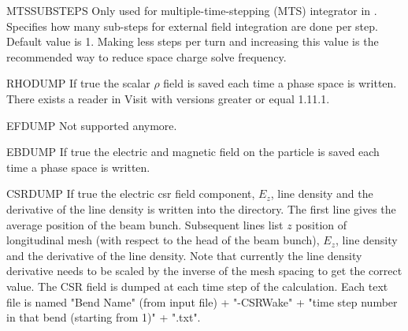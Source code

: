 \begin{kdescription}
  \item[MTSSUBSTEPS]
  Only used for multiple-time-stepping (MTS) integrator in \opalcycl. Specifies how many sub-steps for external field integration are done per step. Default value is 1.
  Making less steps per turn and increasing this value is the recommended way to reduce space charge solve frequency.

  \item[RHODUMP]
  If true the scalar $\rho$ field is saved each time a phase space is written. There exists a reader in Visit with versions
  greater or equal 1.11.1.

  \item[EFDUMP]
  Not supported anymore.

  \item[EBDUMP]
  If true the electric and magnetic field on the particle is saved each time a phase space is written.

  \item[CSRDUMP]
  If true the electric csr field component, $E_z$, line density and the derivative of the line density is written into the  directory.
  The first line gives the average position of the beam bunch.
  Subsequent lines list $z$ position of longitudinal mesh (with respect to the head of the beam bunch),
   $E_z$, line density and the derivative of the line density. Note that currently the line density derivative 
   needs to be scaled by the inverse of the mesh spacing to get the correct value. The CSR field
   is dumped at each time step of the calculation. Each text file is named "Bend Name" (from input file) + "-CSRWake" + "time step number in that bend
   (starting from 1)" + ".txt".



\end{kdescription}
